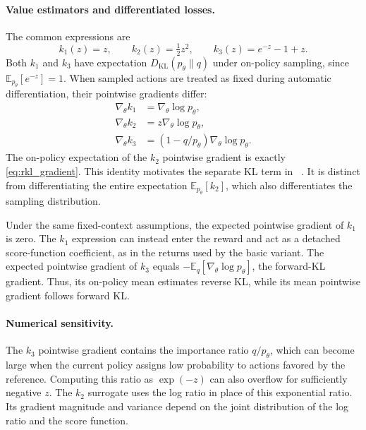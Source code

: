 \paragraph{Value estimators and differentiated losses.}
The common expressions are
\begin{equation}
 k_1(z)=z,\qquad k_2(z)=\tfrac12 z^2,\qquad k_3(z)=e^{-z}-1+z.
\end{equation}
Both $k_1$ and $k_3$ have expectation $D_{\mathrm{KL}}(p_\theta\|q)$ under on-policy sampling, since $\mathbb{E}_{p_\theta}[e^{-z}]=1$. When sampled actions are treated as fixed during automatic differentiation, their pointwise gradients differ:
\begin{equation}
\begin{aligned}
 \nabla_\theta k_1 &=\nabla_\theta\log p_\theta,\\
 \nabla_\theta k_2 &=z\nabla_\theta\log p_\theta,\\
 \nabla_\theta k_3 &=(1-q/p_\theta)\nabla_\theta\log p_\theta.
\end{aligned}
\label{eq:kl_pointwise}
\end{equation}
The on-policy expectation of the $k_2$ pointwise gradient is exactly \cref{eq:rkl_gradient}. This identity motivates the separate KL term in \varn~\citep{liu2025rethinking}. It is distinct from differentiating the entire expectation $\mathbb{E}_{p_\theta}[k_2]$, which also differentiates the sampling distribution.

Under the same fixed-context assumptions, the expected pointwise gradient of $k_1$ is zero. The $k_1$ expression can instead enter the reward and act as a detached score-function coefficient, as in the returns used by the basic variant. The expected pointwise gradient of $k_3$ equals $-\mathbb{E}_q[\nabla_\theta\log p_\theta]$, the forward-KL gradient. Thus, its on-policy mean estimates reverse KL, while its mean pointwise gradient follows forward KL.

\paragraph{Numerical sensitivity.}
The $k_3$ pointwise gradient contains the importance ratio $q/p_\theta$, which can become large when the current policy assigns low probability to actions favored by the reference. Computing this ratio as $\exp(-z)$ can also overflow for sufficiently negative $z$. The $k_2$ surrogate uses the log ratio in place of this exponential ratio. Its gradient magnitude and variance depend on the joint distribution of the log ratio and the score function.


